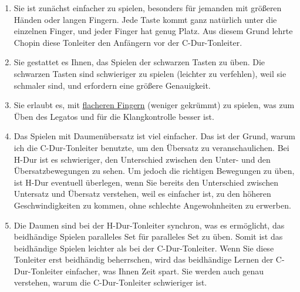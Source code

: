 \begin{enumerate}[label={\arabic*.}] 
\item Sie ist zunächst einfacher zu spielen, besonders für jemanden mit größeren Händen oder langen Fingern.
Jede Taste kommt ganz natürlich unter die einzelnen Finger, und jeder Finger hat genug Platz.
Aus diesem Grund lehrte Chopin diese Tonleiter den Anfängern vor der C-Dur-Tonleiter.
\item Sie gestattet es Ihnen, das Spielen der schwarzen Tasten zu üben.
Die schwarzen Tasten sind schwieriger zu spielen (leichter zu verfehlen), weil sie schmaler sind, und erfordern eine größere Genauigkeit.
\item Sie erlaubt es, mit \hyperref[c1iii4b]{flacheren Fingern} (weniger gekrümmt) zu spielen, was zum Üben des Legatos und für die Klangkontrolle besser ist.
\item Das Spielen mit Daumenübersatz ist viel einfacher.
Das ist der Grund, warum ich die C-Dur-Tonleiter benutzte, um den Übersatz zu veranschaulichen.
Bei H-Dur ist es schwieriger, den Unterschied zwischen den Unter- und den Übersatzbewegungen zu sehen.
Um jedoch die richtigen Bewegungen zu üben, ist H-Dur eventuell überlegen, wenn Sie bereits den Unterschied zwischen Untersatz und Übersatz verstehen, weil es einfacher ist, zu den höheren Geschwindigkeiten zu kommen, ohne schlechte Angewohnheiten zu erwerben.
\item Die Daumen sind bei der H-Dur-Tonleiter synchron, was es ermöglicht, das beidhändige Spielen paralleles Set für paralleles Set zu üben.
Somit ist das beidhändige Spielen leichter als bei der C-Dur-Tonleiter.
Wenn Sie diese Tonleiter erst beidhändig beherrschen, wird das beidhändige Lernen der C-Dur-Tonleiter einfacher, was Ihnen Zeit spart.
Sie werden auch genau verstehen, warum die C-Dur-Tonleiter schwieriger ist.
\end{enumerate}

